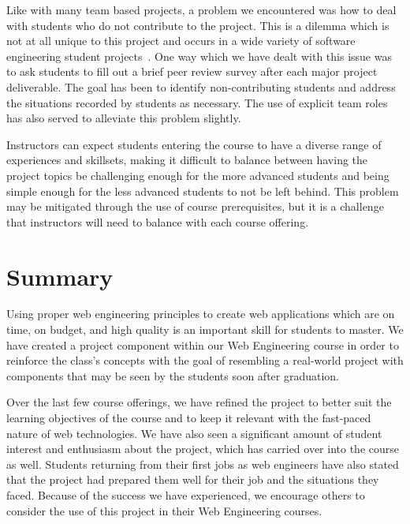 \documentclass{sig-alternate}
\begin{document}
Like with many team based projects, a problem we encountered was how to deal with students who do not contribute to the project. This is a dilemma which is not at all unique to this project and occurs in a wide variety of software engineering student projects~\cite{VanderDuim:2007:GPE:1248820.1248900}. One way which we have dealt with this issue was to ask students to fill out a brief peer review survey after each major project deliverable. The goal has been to identify non-contributing students and address the situations recorded by students as necessary. The use of explicit team roles has also served to alleviate this problem slightly.

Instructors can expect students entering the course to have a diverse range of experiences and skillsets, making it difficult to balance between having the project topics be challenging enough for the more advanced students and being simple enough for the less advanced students to not be left behind. This problem may be mitigated through the use of course prerequisites, but it is a challenge that instructors will need to balance with each course offering.

\section{Summary}
\label{sec: summary}

Using proper web engineering principles to create web applications which are on time, on budget, and high quality is an important skill for students to master. We have created a project component within our Web Engineering course in order to reinforce the class's concepts with the goal of resembling a real-world project with components that may be seen by the students soon after graduation.

Over the last few course offerings, we have refined the project to better suit the learning objectives of the course and to keep it relevant with the fast-paced nature of web technologies. We have also seen a significant amount of student interest and enthusiasm about the project, which has carried over into the course as well. Students returning from their first jobs as web engineers have also stated that the project had prepared them well for their job and the situations they faced. Because of the success we have experienced, we encourage others to consider the use of this project in their Web Engineering courses.



\balance


\end{document}
